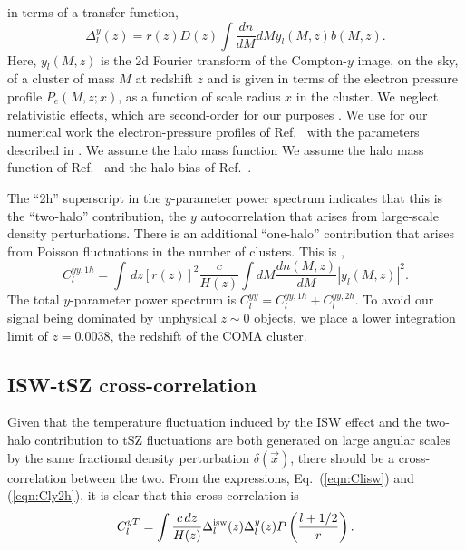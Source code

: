 \documentclass[aps,twocolumn,floats,prd,nofootinbib,10pt,floatfix]{revtex4-1}
\begin{document}
in terms of a transfer function,
\begin{equation}
     \Delta_l^{y}(z) = r(z) D(z) \int \frac{dn}{dM}dM 
     y_l(M,z) b(M,z).
\end{equation}
Here, $y_l(M,z)$ is the 2d Fourier transform of the
Compton-$y$ image, on the sky, of a cluster of mass $M$ at
redshift $z$ and is given in terms of the electron pressure
profile $P_e(M,z;x)$, as a function of scale radius $x$ in the
cluster. We neglect relativistic effects, which are second-order 
for our purposes \cite{Itoh:1997ks}.
We use for our numerical work the electron-pressure profiles of
Ref.~\cite{Nagai:2007mt, Arnaud:2009tt} with the parameters 
described in \cite{Dolag:2015dta}. We assume the halo mass function 
We assume the halo mass function 
of Ref.~\cite{Tinker:2008ff} and the halo bias of
Ref.~\cite{Sheth:1999mn}.

The ``2h'' superscript in the
$y$-parameter power spectrum indicates that this is the
``two-halo'' contribution, the $y$ autocorrelation that arises
from large-scale density perturbations.  There is an additional
``one-halo'' contribution that arises from Poisson fluctuations
in the number of clusters.  This is
\cite{Komatsu:2002wc},
\begin{equation}
     C_l^{yy,1h} = \int\, dz \left[r(z)\right]^2\frac{c}{H(z)}
     \int dM \frac{dn(M,z)}{dM} \left| y_l(M,z)
     \right|^2.
\label{eqn:Cly1h}
\end{equation}
The total $y$-parameter power spectrum is $C_l^{yy} =
C_l^{yy,1h}+C_l^{yy,2h}$.  To avoid our signal being dominated by
unphysical $z\sim 0$ objects, we place a lower integration limit 
of $z=0.0038$, the redshift of the COMA cluster.

\subsection{ISW-tSZ cross-correlation}

Given that the temperature fluctuation induced by the ISW effect
and the two-halo contribution to tSZ fluctuations are both
generated on large angular scales by the same fractional density
perturbation $\delta(\vec x)$, there should be a
cross-correlation between the two.  From the expressions,
Eq.~(\ref{eqn:Clisw}) and (\ref{eqn:Cly2h}), it is clear that this
cross-correlation is
\begin{equation}
     C_l^{yT} = \int \frac{c\, dz}{H(z)} \Delta^{\rm isw}_l(z)
     \Delta^y_l(z) P\left(\frac{l+1/2}{r}\right).
\label{eqn:Clcross}
\end{equation}
\end{document}
